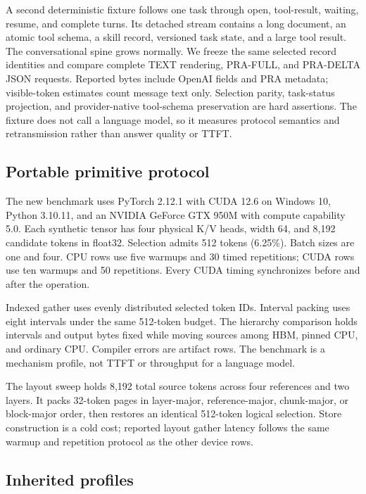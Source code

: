 \documentclass[11pt]{article}
\begin{document}
A second deterministic fixture follows one task through open, tool-result,
waiting, resume, and complete turns. Its detached stream contains a long
document, an atomic tool schema, a skill record, versioned task state, and a
large tool result. The conversational spine grows normally. We freeze the same
selected record identities and compare complete TEXT rendering, PRA-FULL, and
PRA-DELTA JSON requests. Reported bytes include OpenAI fields and PRA metadata;
visible-token estimates count message text only. Selection parity, task-status
projection, and provider-native tool-schema preservation are hard assertions.
The fixture does not call a language model, so it measures protocol semantics
and retransmission rather than answer quality or TTFT.

\subsection{Portable primitive protocol}

The new benchmark uses PyTorch 2.12.1 with CUDA 12.6 on Windows 10, Python
3.10.11, and an NVIDIA GeForce GTX 950M with compute capability 5.0.  Each
synthetic tensor has four physical K/V heads, width 64, and 8,192 candidate
tokens in float32.  Selection admits 512 tokens (6.25\%).  Batch sizes are one
and four.  CPU rows use five warmups and 30 timed repetitions; CUDA rows use ten
warmups and 50 repetitions.  Every CUDA timing synchronizes before and after
the operation.

Indexed gather uses evenly distributed selected token IDs.  Interval packing
uses eight intervals under the same 512-token budget.  The hierarchy comparison
holds intervals and output bytes fixed while moving sources among HBM, pinned
CPU, and ordinary CPU.  Compiler errors are artifact rows.  The benchmark is a
mechanism profile, not TTFT or throughput for a language model.

The layout sweep holds 8,192 total source tokens across four references and two
layers.  It packs 32-token pages in layer-major, reference-major, chunk-major,
or block-major order, then restores an identical 512-token logical selection.
Store construction is a cold cost; reported layout gather latency follows the
same warmup and repetition protocol as the other device rows.

\subsection{Inherited profiles}
\end{document}
